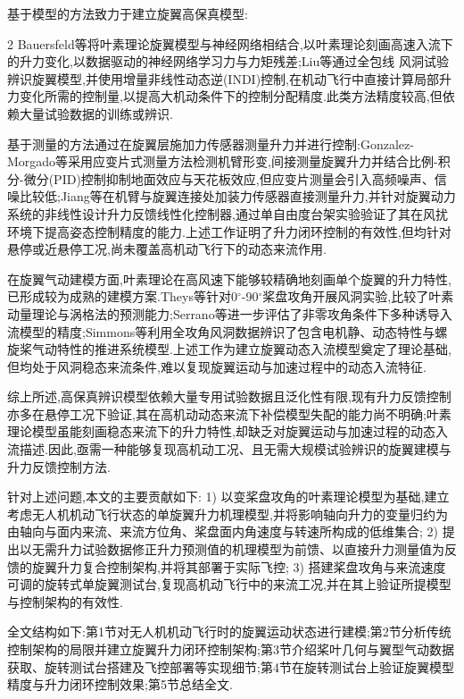 \documentclass{aas}
\begin{document}
基于模型的方法致力于建立旋翼高保真模型:
\onecolumn\begin{multicols}{2}%
\noindent Bauersfeld等\cite{3}将叶素理论旋翼模型与神经网络相结合,以叶素理论刻画高速入流下的升力变化,以数据驱动的神经网络学习力与力矩残差;Liu等\cite{4}通过全包线
风洞试验辨识旋翼模型,并使用增量非线性动态逆(INDI)控制,在机动飞行中直接计算局部升力变化所需的控制量,以提高大机动条件下的控制分配精度.此类方法精度较高,但依赖大量试验数据的训练或辨识.

基于测量的方法通过在旋翼层施加力传感器测量升力并进行控制:Gonzalez-Morgado等\cite{5}采用应变片式测量方法检测机臂形变,间接测量旋翼升力并结合比例-积分-微分(PID)控制抑制地面效应与天花板效应,但应变片测量会引入高频噪声、信噪比较低;Jiang等\cite{6,7}在机臂与旋翼连接处加装力传感器直接测量升力,并针对旋翼动力系统的非线性设计升力反馈线性化控制器,通过单自由度台架实验验证了其在风扰环境下提高姿态控制精度的能力.上述工作证明了升力闭环控制的有效性,但均针对悬停或近悬停工况,尚未覆盖高机动飞行下的动态来流作用.

在旋翼气动建模方面,叶素理论在高风速下能够较精确地刻画单个旋翼的升力特性,已形成较为成熟的建模方案.Theys等\cite{8}针对0$^{\circ}$-90$^{\circ}$桨盘攻角开展风洞实验,比较了叶素动量理论与涡格法的预测能力;Serrano等\cite{9}进一步评估了非零攻角条件下多种诱导入流模型的精度;Simmons等\cite{10}利用全攻角风洞数据辨识了包含电机静、动态特性与螺旋桨气动特性的推进系统模型.上述工作为建立旋翼动态入流模型奠定了理论基础,但均处于风洞稳态来流条件,难以复现旋翼运动与加速过程中的动态入流特征.

综上所述,高保真辨识模型依赖大量专用试验数据且泛化性有限,现有升力反馈控制亦多在悬停工况下验证,其在高机动动态来流下补偿模型失配的能力尚不明确;叶素理论模型虽能刻画稳态来流下的升力特性,却缺乏对旋翼运动与加速过程的动态入流描述.因此,亟需一种能够复现高机动工况、且无需大规模试验辨识的旋翼建模与升力反馈控制方法.

针对上述问题,本文的主要贡献如下:
1) 以变桨盘攻角的叶素理论模型为基础,建立考虑无人机机动飞行状态的单旋翼升力机理模型,并将影响轴向升力的变量归约为由轴向与面内来流、来流方位角、桨盘面内角速度与转速所构成的低维集合;
2) 提出以\textcolor{mygreen}{无需升力试验数据修正升力预测值的机理模型}为前馈、以直接升力测量值为反馈的旋翼升力复合控制架构,并将其部署于实际飞控;
3) 搭建桨盘攻角与来流速度可调的旋转式单旋翼测试台,复现高机动飞行中的来流工况,并在其上验证所提模型与控制架构的有效性.

全文结构如下:第1节对无人机机动飞行时的旋翼运动状态进行建模;第2节分析传统控制架构的局限并建立旋翼升力闭环控制架构;第3节介绍桨叶几何与翼型气动数据获取、旋转测试台搭建及飞控部署等实现细节;第4节在旋转测试台上验证旋翼模型精度与升力闭环控制效果;第5节总结全文.

\end{multicols}
\end{document}

